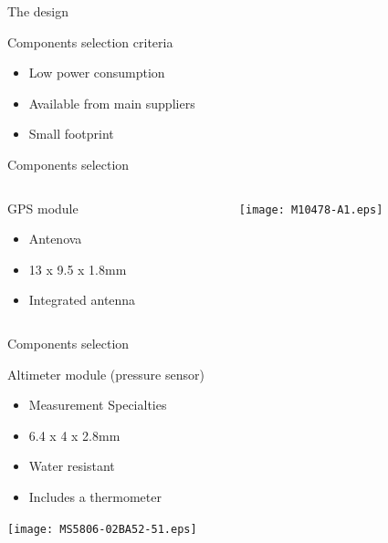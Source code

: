 \documentclass[compress,red]{beamer}
\begin{document}
\begin{frame}{The design}

  Components selection criteria

  \begin{itemize}
  \item Low power consumption
  \item Available from main suppliers
  \item Small footprint
  \end{itemize}


\end{frame}

\begin{frame}{Components selection}

  \begin{columns}[T] %
    \begin{column}{.48\textwidth}

      GPS module

      \begin{itemize}
      \item Antenova
      \item 13 x 9.5 x 1.8mm
      \item Integrated antenna
      \end{itemize}

    \end{column}
    \hfill%
    \begin{column}{.48\textwidth}
      \begin{center}
        \texttt{[image: M10478-A1.eps]}
      \end{center}
    \end{column}%
  \end{columns}

  \note[item]{}

\end{frame}

\begin{frame}{Components selection}

  Altimeter module (pressure sensor)

  \begin{itemize}
  \item Measurement Specialties
  \item 6.4 x 4 x 2.8mm
  \item Water resistant
  \item Includes a thermometer
  \end{itemize}

  \begin{center}
    \texttt{[image: MS5806-02BA52-51.eps]}
  \end{center}

  \note[item]{}

\end{frame}
\end{document}
